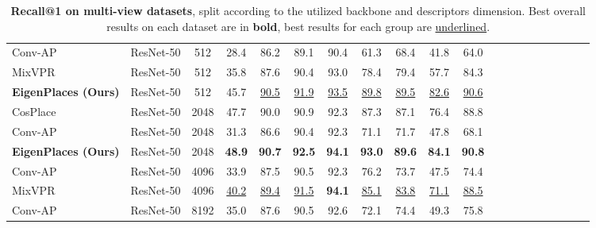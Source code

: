 \documentclass[10pt,twocolumn,letterpaper]{article}
\begin{document}
\begin{table*}
\begin{center}
\begin{adjustbox}{width=0.9\linewidth}
\begin{tabular}{lccccccccccccccccccc}
Conv-AP \cite{Alibey_2022_gsvcities}     & ResNet-50 &  512 &           28.4 &           86.2 &           89.1 &           90.4 &           61.3 &           68.4 &           41.8 &           64.0 \\
MixVPR \cite{Alibey_2023_mixvpr}         & ResNet-50 &  512 &           35.8 &           87.6 &           90.4 &           93.0 &           78.4 &           79.4 &           57.7 &           84.3 \\
\textbf{EigenPlaces (Ours)}              & ResNet-50 &  512 &           45.7 &\underline{90.5}&\underline{91.9}&\underline{93.5}&\underline{89.8}&\underline{89.5}&\underline{82.6}&\underline{90.6}\\
\hline
CosPlace \cite{Berton_2022_cosPlace}     & ResNet-50 & 2048 &           47.7 &           90.0 &           90.9 &           92.3 &           87.3 &           87.1 &           76.4 &           88.8 \\
Conv-AP \cite{Alibey_2022_gsvcities}     & ResNet-50 & 2048 &           31.3 &           86.6 &           90.4 &           92.3 &           71.1 &           71.7 &           47.8 &           68.1 \\
\textbf{EigenPlaces (Ours)}              & ResNet-50 & 2048 &  \textbf{48.9} &  \textbf{90.7} &  \textbf{92.5} &  \textbf{94.1} &  \textbf{93.0} &  \textbf{89.6} &  \textbf{84.1} &  \textbf{90.8} \\
\hline
Conv-AP \cite{Alibey_2022_gsvcities}     & ResNet-50 & 4096 &           33.9 &           87.5 &           90.5 &           92.3 &           76.2 &           73.7 &           47.5 &           74.4 \\
MixVPR \cite{Alibey_2023_mixvpr}         & ResNet-50 & 4096 &\underline{40.2}&\underline{89.4}&\underline{91.5}&  \textbf{94.1} &\underline{85.1}&\underline{83.8}&\underline{71.1}&\underline{88.5}\\
Conv-AP \cite{Alibey_2022_gsvcities}     & ResNet-50 & 8192 &           35.0 &           87.6 &           90.5 &           92.6 &           72.1 &           74.4 &           49.3 &           75.8 \\


\bottomrule
\end{tabular}
\end{adjustbox}
\end{center}
\caption{\textbf{Recall@1 on multi-view datasets}, split according to the utilized backbone and descriptors dimension. Best overall results on each dataset are in \textbf{bold}, best results for each group are \underline{underlined}.}
\label{tab:multi_view}
\end{table*}
\end{document}
